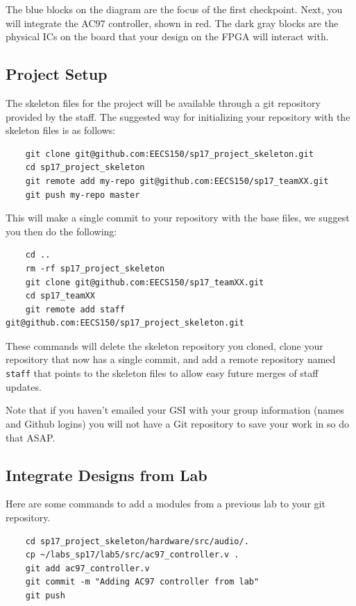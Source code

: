 \documentclass[11pt]{article}
\begin{document}
The blue blocks on the diagram are the focus of the first checkpoint. Next, you will integrate the AC97 controller, shown in red. The dark gray blocks are the physical ICs on the board that your design on the FPGA will interact with.

\subsection{Project Setup}
The skeleton files for the project will be available through a git repository provided by the staff. The suggested way for initializing your repository with the skeleton files is as follows:

\begin{verbatim}
	git clone git@github.com:EECS150/sp17_project_skeleton.git
	cd sp17_project_skeleton
	git remote add my-repo git@github.com:EECS150/sp17_teamXX.git
	git push my-repo master
\end{verbatim}

This will make a single commit to your repository with the base files, we suggest you then do the following:

\begin{verbatim}
	cd ..
	rm -rf sp17_project_skeleton
	git clone git@github.com:EECS150/sp17_teamXX.git
	cd sp17_teamXX
	git remote add staff git@github.com:EECS150/sp17_project_skeleton.git
\end{verbatim}

These commands will delete the skeleton repository you cloned, clone your repository that now has a single commit, and add a remote repository named \verb|staff| that points to the skeleton files to allow easy future merges of staff updates.

Note that if you haven’t emailed your GSI with your group information (names and Github logins) you will not have a Git repository to save your work in so do that ASAP.

\subsection{Integrate Designs from Lab}
Here are some commands to add a modules from a previous lab to your git repository.

\begin{verbatim}
	cd sp17_project_skeleton/hardware/src/audio/.
	cp ~/labs_sp17/lab5/src/ac97_controller.v .
	git add ac97_controller.v
	git commit -m "Adding AC97 controller from lab"
	git push
\end{verbatim}
\end{document}
